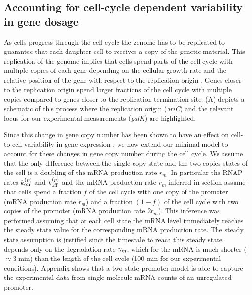 \subsection*{Accounting for cell-cycle dependent variability in gene dosage}
\label{sec_cell_cycle}

As cells progress through the cell cycle the genome has to be replicated to
guarantee that each daughter cell to receives a copy of the genetic material.
This replication of the genome implies that cells spend parts of the cell cycle
with multiple copies of each gene depending on the cellular growth rate and the
relative position of the gene with respect to the replication origin
\cite{Bremer1996}. Genes closer to the replication origin spend larger fractions
of the cell cycle with multiple copies compared to genes closer to the
replication termination site. (A) depicts a schematic of
this process where the replication origin ({\it oriC}) and the relevant locus
for our experimental measurements ({\it galK}) are highlighted.

Since this change in gene copy number has been shown to have an effect on
cell-to-cell variability in gene expression \cite{Jones2014a, Peterson2015}, we
now extend our minimal model to account for these changes in gene copy number
during the cell cycle.  We assume that the only difference between the
single-copy state and the two-copies states of the cell is a doubling of the
mRNA production rate $r_m$. In particular the RNAP rates $k^{(p)}_{\text{on}}$ and $k^{(p)}_{\text{off}}$
and the mRNA production rate $r_m$ inferred in section 
assume that cells spend a fraction $f$ of the cell cycle  with one copy of the
promoter (mRNA production rate $r_m$) and a fraction $(1-f)$ of the cell cycle
with two copies of the promoter (mRNA production rate $2 r_m$). This inference
was performed assuming that at each cell state the mRNA level immediately
reaches the steady state value for the corresponding mRNA production rate. The
steady state assumption is justified since the timescale to reach this steady
state depends only on the degradation rate $\gamma _m$, which for the mRNA  is much
shorter ($\approx 3$ min) than the length of the cell cycle (100 min for our
experimental conditions). Appendix 
shows that  a two-state promoter model is able to capture the experimental data
from single molecule mRNA counts of an unregulated promoter.

